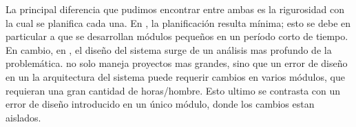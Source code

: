 	La principal diferencia que pudimos encontrar entre ambas es la rigurosidad con la cual se planifica cada una. En \pis, la planificación resulta mínima; esto se debe en particular a que se desarrollan módulos pequeños en un período corto de tiempo. En cambio, en \pil, el diseño del sistema surge de un análisis mas profundo de la problemática. \pil no solo maneja proyectos mas grandes, sino que un error de diseño en un la arquitectura del sistema puede requerir cambios en varios módulos, que requieran una gran cantidad de horas/hombre. Esto ultimo se contrasta con un error de diseño introducido en un único módulo, donde los cambios estan aislados.

